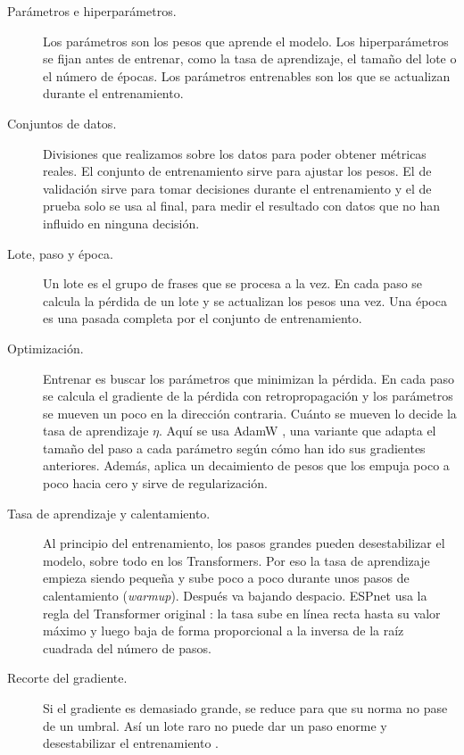 \begin{description}
  \item[Parámetros e hiperparámetros.] Los parámetros son los pesos que aprende el modelo. Los hiperparámetros se fijan antes de entrenar, como la tasa de aprendizaje, el tamaño del lote o el número de épocas. Los parámetros entrenables son los que se actualizan durante el entrenamiento.

  \item[Conjuntos de datos.] Divisiones que realizamos sobre los datos para poder obtener métricas reales. El conjunto de entrenamiento sirve para ajustar los pesos. El de validación sirve para tomar decisiones durante el entrenamiento y el de prueba solo se usa al final, para medir el resultado con datos que no han influido en ninguna decisión.

  \item[Lote, paso y época.] Un lote es el grupo de frases que se procesa a la vez. En cada paso se calcula la pérdida de un lote y se actualizan los pesos una vez. Una época es una pasada completa por el conjunto de entrenamiento.

  \item[Optimización.] Entrenar es buscar los parámetros que minimizan la pérdida. En cada paso se calcula el gradiente de la pérdida con retropropagación y los parámetros se mueven un poco en la dirección contraria. Cuánto se mueven lo decide la tasa de aprendizaje $\eta$. Aquí se usa AdamW \cite{kingma2015adam,loshchilov2019adamw}, una variante que adapta el tamaño del paso a cada parámetro según cómo han ido sus gradientes anteriores. Además, aplica un decaimiento de pesos que los empuja poco a poco hacia cero y sirve de regularización.

  \item[Tasa de aprendizaje y calentamiento.] Al principio del entrenamiento, los pasos grandes pueden desestabilizar el modelo, sobre todo en los Transformers. Por eso la tasa de aprendizaje empieza siendo pequeña y sube poco a poco durante unos pasos de calentamiento (\textit{warmup}). Después va bajando despacio. ESPnet usa la regla del Transformer original \cite{vaswani2017attention}: la tasa sube en línea recta hasta su valor máximo y luego baja de forma proporcional a la inversa de la raíz cuadrada del número de pasos.

  \item[Recorte del gradiente.] Si el gradiente es demasiado grande, se reduce para que su norma no pase de un umbral. Así un lote raro no puede dar un paso enorme y desestabilizar el entrenamiento \cite{pascanu2013clipping}.


\end{description}
